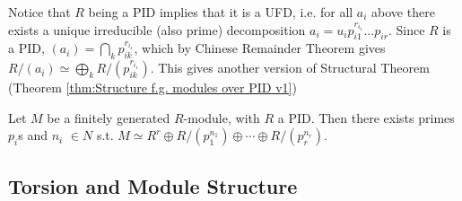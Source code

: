 \documentclass{article}
\begin{document}
\begin{remark}
    Notice that $R$ being a PID implies that it is a UFD, i.e. for all $a_i$ above there exists a unique irreducible (also prime) decomposition $a_i = u_i p_{i1}^{r_{i_1}} \ldots p_{ir}$. Since $R$ is a PID, $(a_i) = \bigcap_k p_{ik}^{r_{i_1}}$, which by Chinese Remainder Theorem gives $R/(a_i) \simeq \bigoplus_k R/(p_{ik}^{r_{i_1}})$. This gives another version of Structural Theorem (Theorem \ref{thm:Structure f.g. modules over PID v1})
\end{remark}

\begin{theorem}[Structure, v2]\label{thm:Structure f.g. modules over PID v2}
    Let $M$ be a finitely generated $R$-module, with $R$ a PID. Then there exists primes $p_i$s and $n_i$ $\in N$ s.t. $M \simeq R^r \oplus R/(p_1^{n_1}) \oplus \cdots \oplus R/(p_r^{n_r})$.
\end{theorem}

\subsection{Torsion and Module Structure}
\end{document}
